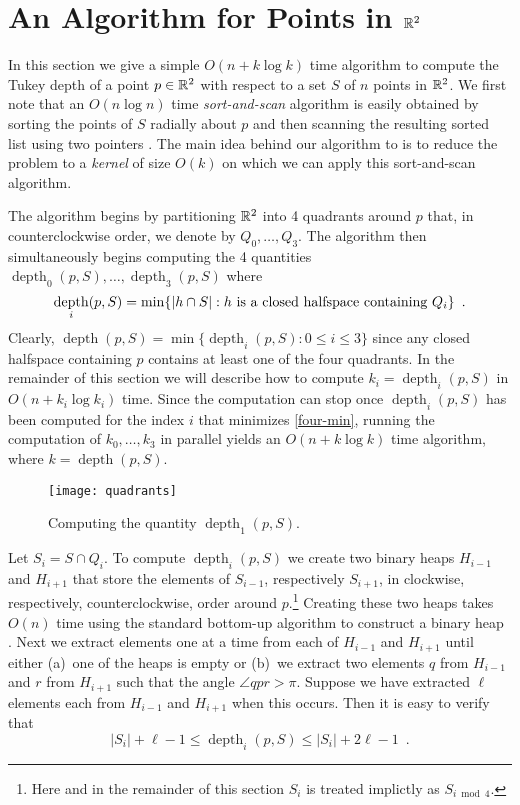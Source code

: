\documentclass[charterfonts,lotsofwhite]{patmorin}
\DeclareMathOperator{\td}{depth}
\begin{document}
\section{An Algorithm for Points in $\mathbb{R}^2$}

In this section we give a simple $O(n + k\log k)$ time algorithm to
compute the Tukey depth of a point $p\in\mathbb{R}^2$ with respect to a set
$S$ of $n$ points in $\mathbb{R}^2$.  We first note that an $O(n\log n)$ time
\emph{sort-and-scan} algorithm is easily obtained by sorting the
points of $S$ radially about $p$ and then scanning the resulting
sorted list using two pointers \cite{m91}.  The main idea behind our
algorithm to is to reduce the problem to a \emph{kernel} of size
$O(k)$ on which we can apply this sort-and-scan algorithm.

The algorithm begins by partitioning $\mathbb{R}^2$ into 4 quadrants around
$p$ that, in counterclockwise order, we denote by $Q_0,\ldots,Q_3$.
The algorithm then simultaneously begins computing the 4 quantities
$\td_0(p,S),\ldots,\td_3(p,S)$ where 
\begin{equation}
     \td_i(p,S) = \min\{|h\cap S| : \mbox{$h$ is a closed halfspace containing $Q_i$} \} \enspace . \eqlabel{four-min}
\end{equation}
Clearly, $\td(p,S) = \min\{\td_i(p,S): 0\le i \le 3 \}$ since any
closed halfspace containing $p$ contains at least one of the four quadrants.
In the remainder of this section we will describe how to compute
$k_i=\td_i(p,S)$ in $O(n + k_i\log k_i)$ time.  Since the
computation can stop once $\td_i(p,S)$ has been computed for
the index $i$ that minimizes \eqref{four-min}, running the computation
of $k_0,\ldots,k_3$ in parallel yields an $O(n +
k\log k)$ time algorithm, where $k=\td(p,S)$.

\begin{figure}
\begin{center} \texttt{[image: quadrants]} \end{center}
\caption{Computing the quantity $\td_1(p,S)$.}
\end{figure}


Let $S_i=S\cap Q_i$. To compute $\td_i(p,S)$ we create two binary
heaps $H_{i-1}$ and $H_{i+1}$ that store the elements of $S_{i-1}$,
respectively $S_{i+1}$, in clockwise, respectively, counterclockwise,
order around $p$.\footnote{Here and in the remainder of this section
$S_i$ is treated implictly as $S_{i\bmod 4}$.} 
Creating these two heaps takes $O(n)$ time using the
standard bottom-up algorithm to construct a binary heap
\cite[Chapter~6]{clrs01}.
Next we extract elements one at a time from each of $H_{i-1}$ and
$H_{i+1}$ until either (a)~one of the heaps is empty or (b)~we extract
two elements $q$ from $H_{i-1}$ and $r$ from $H_{i+1}$ such that the
angle $\angle qpr > \pi$.  Suppose we have extracted $\ell$ elements
each from $H_{i-1}$ and $H_{i+1}$ when this occurs.  Then it is easy
to verify that 
\[  
  |S_i| + \ell - 1 \le \td_i(p,S) \le |S_i| + 2\ell-1 \enspace .
\]
\end{document}
